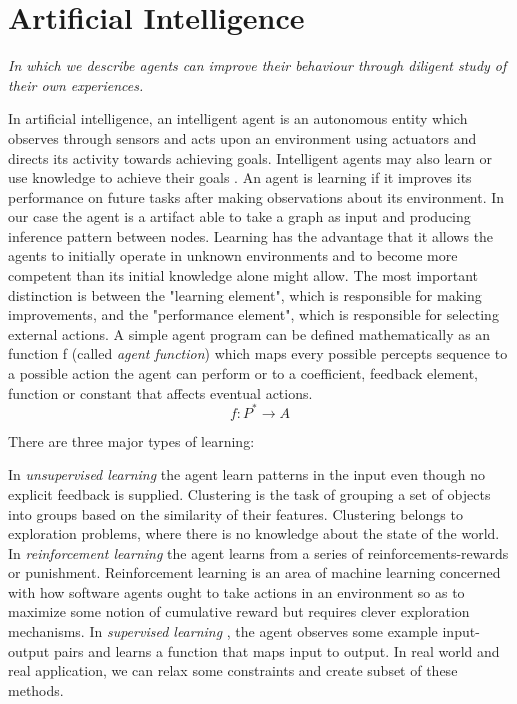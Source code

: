 \documentclass{report}
\begin{document}
\section{Artificial Intelligence}
\textit{In which we describe agents can improve their behaviour through diligent study of their own experiences.}
\vspace{0.3cm}

In artificial intelligence, an intelligent agent is an autonomous entity which observes through sensors and acts upon an environment using actuators and directs its activity towards achieving goals. Intelligent agents may also learn or use knowledge to achieve their goals \cite{agent}. An agent is learning if it improves its performance on future tasks after making observations about its environment. In our case the agent is a  artifact able to take a graph as input and producing inference pattern between nodes.
Learning has the advantage that it allows the agents to initially operate in unknown environments and to become more competent than its initial knowledge alone might allow. The most important distinction is between the "learning element", which is responsible for making improvements, and the "performance element", which is responsible for selecting external actions.
A simple agent program can be defined mathematically as an function f (called \textit{agent function}) which maps every possible percepts sequence to a possible action the agent can perform or to a coefficient, feedback element, function or constant that affects eventual actions.
\begin{equation}
f:P^* \rightarrow A
\end{equation}

There are three major types of learning:

 In\textit{ unsupervised learning }the agent learn patterns in the input even though no explicit feedback is supplied. Clustering is the task of grouping a set of objects into groups based on the similarity of their features. Clustering belongs to exploration problems, where there is no knowledge about the state of the world. In \textit{reinforcement learning} the agent learns from a series of reinforcements-rewards or punishment. Reinforcement learning is an area of machine learning concerned with how software agents ought to take actions in an environment so as to maximize some notion of cumulative reward but requires clever exploration mechanisms. In \textit{supervised learning }, the agent observes some example input-output pairs and learns a function that maps input to output. In real world and real application, we can relax some constraints and create subset of these methods.
\end{document}
